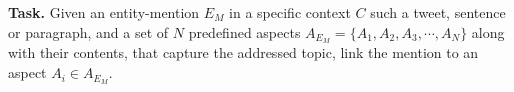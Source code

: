 \documentclass[sigconf,authordraft]{acmart}
\begin{document}

\textbf{Task.} Given an entity-mention $E_M$ in a specific context $C$ such a tweet, sentence or paragraph, and a set of $N$ predefined aspects $A_{E_M} = \{A_1, A_2, A_3, \cdots, A_N\}$ along with their contents, that capture the addressed topic, link the mention to an aspect $A_i \in A_{E_M}$.
\end{document}
